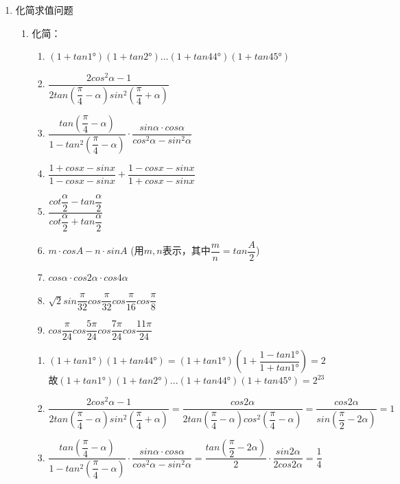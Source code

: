 \begin{enumerate}
\item 化简求值问题
    \begin{enumerate}
        \item 化简：
        \begin{enumerate}
            \item $(1+tan\ang{1})(1+tan\ang{2})...(1+tan\ang{44})(1+tan\ang{45})$
            \item $\dfrac{2cos^2\alpha - 1}{2tan(\dfrac{\pi}{4} - \alpha)sin^2(\dfrac{\pi}{4}+\alpha)}$        
            \item $\dfrac{tan(\dfrac{\pi}{4} - \alpha)}{1 - tan^2(\dfrac{\pi}{4} - \alpha)} \cdot \dfrac{sin\alpha \cdot cos\alpha}{cos^2\alpha - sin^2\alpha}$
            \item $\dfrac{1+cosx-sinx}{1-cosx-sinx} + \dfrac{1-cosx-sinx}{1+cosx-sinx}$   
            \item $\dfrac{cot\dfrac{\alpha}{2} - tan\dfrac{\alpha}{2}}{cot\dfrac{\alpha}{2} + tan\dfrac{\alpha}{2}}$ 
            \item $m\cdot cosA - n \cdot sinA$ (用$m,n$表示，其中$\dfrac{m}{n} = tan\dfrac{A}{2}$)
            \item $cos\alpha \cdot cos2\alpha \cdot cos4\alpha$
            \item $\sqrt{2}sin\dfrac{\pi}{32}cos\dfrac{\pi}{32}cos\dfrac{\pi}{16}cos\dfrac{\pi}{8}$
            \item $cos\dfrac{\pi}{24}cos\dfrac{5\pi}{24}cos\dfrac{7\pi}{24}cos\dfrac{11\pi}{24}$
        \end{enumerate}
        \begin{jieda}          
            \begin{enumerate}
                \item $(1+tan\ang{1})(1+tan\ang{44}) = (1+tan\ang{1})(1+\dfrac{1-tan\ang{1}}{1+tan\ang{1}}) = 2$ \\
                故$(1+tan\ang{1})(1+tan\ang{2})...(1+tan\ang{44})(1+tan\ang{45}) = 2^{23}$
                \item $\dfrac{2cos^2\alpha - 1}{2tan(\dfrac{\pi}{4} - \alpha)sin^2(\dfrac{\pi}{4}+\alpha)} = \dfrac{cos2\alpha}{2tan(\dfrac{\pi}{4} - \alpha)cos^2(\dfrac{\pi}{4}-\alpha)} = \dfrac{cos2\alpha}{sin(\dfrac{\pi}{2} - 2\alpha)} = 1$
                \item $\dfrac{tan(\dfrac{\pi}{4} - \alpha)}{1 - tan^2(\dfrac{\pi}{4} - \alpha)} \cdot \dfrac{sin\alpha \cdot cos\alpha}{cos^2\alpha - sin^2\alpha} = \dfrac{tan(\dfrac{\pi}{2} - 2\alpha)}{2}\cdot \dfrac{sin2\alpha}{2cos2\alpha} = \dfrac{1}{4}$

\end{enumerate}
\end{jieda}
\end{enumerate}
\end{enumerate}
